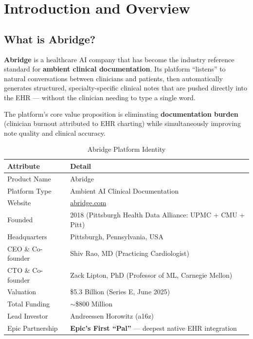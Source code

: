 \documentclass[12pt,a4paper]{article}
\begin{document}
\section{Introduction and Overview}

\subsection{What is Abridge?}

\textbf{Abridge} is a healthcare AI company that has become the industry reference standard for \textbf{ambient clinical documentation}. Its platform ``listens'' to natural conversations between clinicians and patients, then automatically generates structured, specialty-specific clinical notes that are pushed directly into the EHR --- without the clinician needing to type a single word.

The platform's core value proposition is eliminating \textbf{documentation burden} (clinician burnout attributed to EHR charting) while simultaneously improving note quality and clinical accuracy.

\begin{table}[H]
\centering
\renewcommand{\arraystretch}{1.4}
\begin{tabularx}{\textwidth}{lX}
\toprule
\textbf{Attribute} & \textbf{Detail} \\
\midrule
Product Name     & Abridge \\
Platform Type    & Ambient AI Clinical Documentation \\
Website          & \href{https://abridge.com}{abridge.com} \\
Founded          & 2018 (Pittsburgh Health Data Alliance: UPMC + CMU + Pitt) \\
Headquarters     & Pittsburgh, Pennsylvania, USA \\
CEO \& Co-founder & Shiv Rao, MD (Practicing Cardiologist) \\
CTO \& Co-founder & Zack Lipton, PhD (Professor of ML, Carnegie Mellon) \\
Valuation        & \$5.3 Billion (Series E, June 2025) \\
Total Funding    & $\sim$\$800 Million \\
Lead Investor    & Andreessen Horowitz (a16z) \\
Epic Partnership & \textbf{Epic's First ``Pal''} --- deepest native EHR integration \\
\bottomrule
\end{tabularx}
\caption{Abridge Platform Identity}
\end{table}
\end{document}
